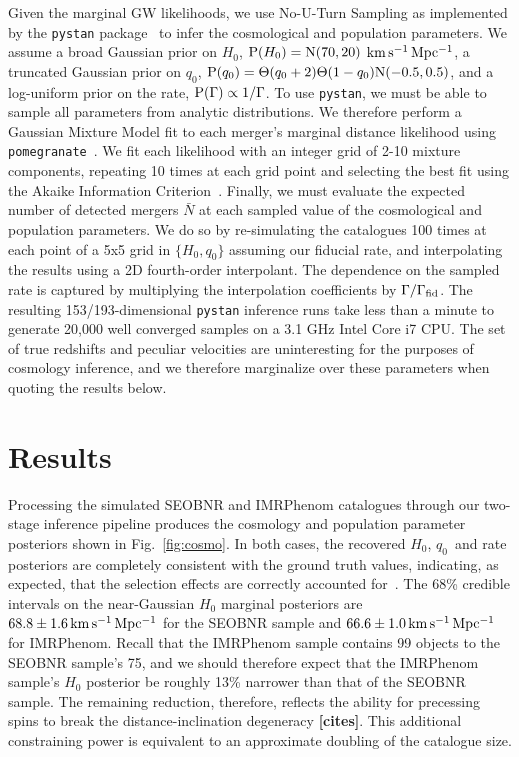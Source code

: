 \documentclass[%
 reprint,
 superscriptaddress,
 nofootinbib,
 amsmath,amssymb,
 aps,
]{revtex4-2}
\newcommand{\hubble}{\ensuremath{H_0}}
\newcommand{\decel}{\ensuremath{q_0}}
\newcommand{\prob}{\ensuremath{{\rm P}}}
\newcommand{\normal}{{\rm{N}}}
\newcommand{\nexp}{\bar{N}}
\newcommand{\rate}{\Gamma}
\newcommand{\step}{\Theta}
\newcommand{\kmsmpc}{\ensuremath{{\rm km\,s^{-1}\,Mpc^{-1}}}}
\begin{document}
Given the marginal GW likelihoods, we use No-U-Turn Sampling as implemented by the \texttt{pystan} package~\cite{pystan} to infer the cosmological and population parameters. We assume a broad Gaussian prior on \hubble, $\prob(\hubble)=\normal(70,20)$ \kmsmpc, a truncated Gaussian prior on \decel, $\prob(\decel)=\step(\decel+2)\step(1-\decel)\normal(-0.5,0.5)$, and a log-uniform prior on the rate, $\prob(\rate) \propto 1/\rate$. To use \texttt{pystan}, we must be able to sample all parameters from analytic distributions. We therefore perform a Gaussian Mixture Model fit to each merger's marginal distance likelihood using \texttt{pomegranate}~\cite{Schreiber:2017}. We fit each likelihood with an integer grid of 2-10 mixture components, repeating 10 times at each grid point and selecting the best fit using the Akaike Information Criterion~\cite{Akaike:1974}. Finally, we must evaluate the expected number of detected mergers $\nexp$ at each sampled value of the cosmological and population parameters. We do so by re-simulating the catalogues 100 times at each point of a 5x5 grid in $\{H_0,q_0\}$ assuming our fiducial rate, and interpolating the results using a 2D fourth-order interpolant. The dependence on the sampled rate is captured by multiplying the interpolation coefficients by $\Gamma/\Gamma_{\rm fid}$. The resulting 153/193-dimensional \texttt{pystan} inference runs take less than a minute to generate 20,000 well converged samples on a 3.1 GHz Intel Core i7 CPU. The set of true redshifts and peculiar velocities are uninteresting for the purposes of cosmology inference, and we therefore marginalize over these parameters when quoting the results below.


\section{Results} \label{sec:results}

Processing the simulated SEOBNR and IMRPhenom catalogues through our two-stage inference pipeline produces the cosmology and population parameter posteriors shown in Fig.~\ref{fig:cosmo}. In both cases, the recovered \hubble, \decel\ and rate posteriors are completely consistent with the ground truth values, indicating, as expected, that the selection effects are correctly accounted for~\cite{Mortlock_etal:2019}. The 68\% credible intervals on the near-Gaussian $\hubble$ marginal posteriors are $68.8 \pm 1.6\,\kmsmpc$ for the SEOBNR sample and $66.6 \pm 1.0\,\kmsmpc$ for IMRPhenom. Recall that the IMRPhenom sample contains 99 objects to the SEOBNR sample's 75, and we should therefore expect that the IMRPhenom sample's $\hubble$ posterior be roughly 13\% narrower than that of the SEOBNR sample. The remaining reduction, therefore, reflects the ability for precessing spins to break the distance-inclination degeneracy {\bf [cites]}. This additional constraining power is equivalent to an approximate doubling of the catalogue size.
\end{document}
